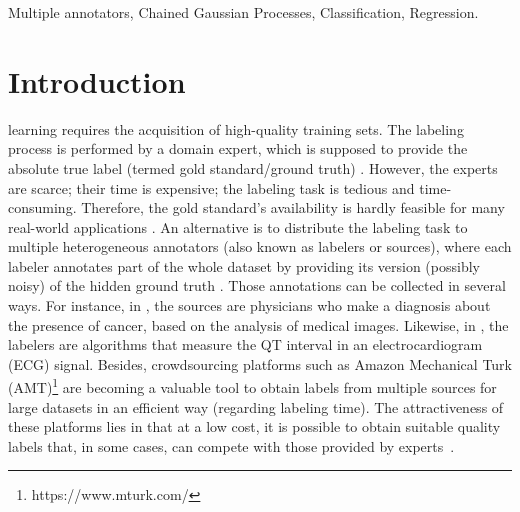 \documentclass[journal]{IEEEtran}
\begin{document}
\begin{IEEEkeywords}
Multiple annotators, Chained Gaussian Processes, Classification, Regression.
\end{IEEEkeywords}

%
\IEEEpeerreviewmaketitle



\section{Introduction}

 learning requires the acquisition of high-quality training sets. The labeling process is performed by a domain expert, which is supposed to provide the absolute true label (termed gold standard/ground truth) \citep{zhang2019crowdsourced}. However, the experts are scarce; their time is expensive; the labeling task is tedious and time-consuming. Therefore, the gold standard's availability is hardly feasible for many real-world applications \citep{liu2020truth}. An alternative is to distribute the labeling task to multiple heterogeneous annotators (also known as labelers or sources), where each labeler annotates part of the whole dataset by providing its version (possibly noisy) of the hidden ground truth \cite{kara2015modeling}. Those annotations can be collected in several ways. For instance, in \cite{raykar2010learning}, the sources are physicians who make a diagnosis about the presence of cancer, based on the analysis of medical images. Likewise, in \cite{zhu2019unsupervised}, the labelers are algorithms that measure the QT interval in an electrocardiogram (ECG) signal. Besides, crowdsourcing platforms such as Amazon Mechanical Turk (AMT)\footnote{https://www.mturk.com/} are becoming a valuable tool to obtain labels from multiple sources for large datasets in an efficient way (regarding labeling time). The attractiveness of these platforms lies in that at a low cost, it is possible to obtain suitable quality labels that, in some cases, can compete with those provided by experts~\cite{snow2008cheap}. 
\end{document}
